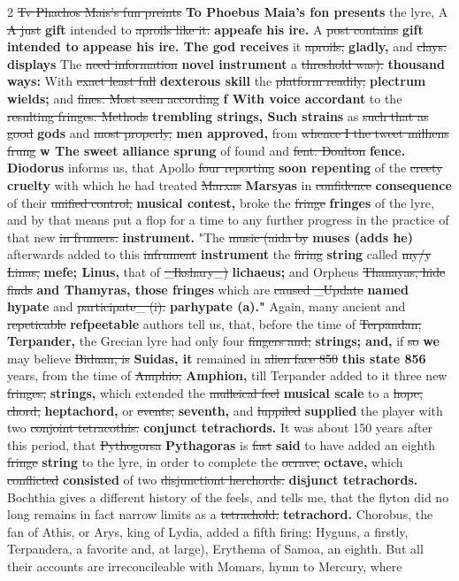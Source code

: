\documentclass[10pt]{article}
\begin{document}
\begin{multicols}{2}
\sout{Tv Phachos Mais’s fun preints} \textbf{To Phoebus Maia's fon presents} the lyre, A \sout{A just} \textbf{gift} intended to \sout{aproils like it.} \textbf{appeafe his ire.} A \sout{post contains} \textbf{gift intended to appease his ire. The god receives} it \sout{aproils,} \textbf{gladly,} and \sout{clays.} \textbf{displays} The \sout{need information} \textbf{novel instrument} a \sout{threshold was).} \textbf{thousand ways:} With \sout{exact least full} \textbf{dexterous skill} the \sout{platform readily,} \textbf{plectrum wields;} and \sout{fines. Most seen according} \textbf{f With voice accordant} to the \sout{resulting fringes. Methods} \textbf{trembling strings, Such strains} as \sout{such that as good} \textbf{gods} and \sout{most properly,} \textbf{men approved,} from \sout{whence I the tweet milhens frung} \textbf{w The sweet alliance sprung} of found and \sout{fent. Doulton} \textbf{fence. Diodorus} informs us, that Apollo \sout{four reporting} \textbf{soon repenting} of the \sout{creety} \textbf{cruelty} with which he had treated \sout{Marxas} \textbf{Marsyas} in \sout{confidence} \textbf{consequence} of their \sout{unified control,} \textbf{musical contest,} broke the \sout{fringe} \textbf{fringes} of the lyre, and by that means put a flop for a time to any further progress in the practice of that new \sout{in frumers.} \textbf{instrument.} "The \sout{music (aida by} \textbf{muses (adds he)} afterwards added to this \sout{infrument} \textbf{instrument} the \sout{firing} \textbf{string} called \sout{my/y Linas,} \textbf{mefe; Linus,} that of \sout{\_Ikshary\_)} \textbf{lichaeus;} and Orpheus \sout{Thanayas, hide finds} \textbf{and Thamyras, those fringes} which are \sout{caused \_Update} \textbf{named hypate} and \sout{participate\_ (i).} \textbf{parhypate (a)."} Again, many ancient and \sout{repeticable} \textbf{refpeetable} authors tell us, that, before the time of \sout{Terpandan,} \textbf{Terpander,} the Grecian lyre had only four \sout{fingers and;} \textbf{strings; and,} if \sout{so} \textbf{we} may believe \sout{Biduan, is} \textbf{Suidas, it} remained in \sout{alien face 850} \textbf{this state 856} years, from the time of \sout{Amphio,} \textbf{Amphion,} till Terpander added to it three new \sout{fringes,} \textbf{strings,} which extended the \sout{mulleical feel} \textbf{musical scale} to a \sout{hope, chord,} \textbf{heptachord,} or \sout{events,} \textbf{seventh,} and \sout{luppiled} \textbf{supplied} the player with two \sout{conjoint tetracothis.} \textbf{conjunct tetrachords.} It was about 150 years after this period, that \sout{Pythogorsa} \textbf{Pythagoras} is \sout{fast} \textbf{said} to have added an eighth \sout{fringe} \textbf{string} to the lyre, in order to complete the \sout{ocrave,} \textbf{octave,} which \sout{conflicted} \textbf{consisted} of two \sout{disjunctiont herchords.} \textbf{disjunct tetrachords.} Bochthia gives a different history of the feels, and tells me, that the flyton did no long remains in fact narrow limits as a \sout{tetrachold.} \textbf{tetrachord.} Chorobus, the fan of Athis, or Arys, king of Lydia, added a fifth firing; Hyguns, a firstly, Terpandera, a favorite and, at large), Erythema of Samoa, an eighth. But all their accounts are irreconcileable with Momars, hymn to Mercury, where 
\end{multicols}
\end{document}
